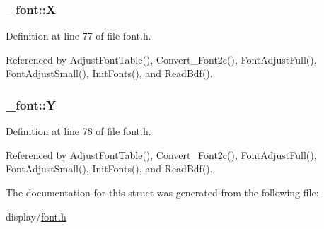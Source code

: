 \hypertarget{struct__font_a64a08fdbdaa19418a9b7a34a2db33150}{
\subsubsection[{X}]{ \-\_\-font\-::\-X}}\label{struct__font_a64a08fdbdaa19418a9b7a34a2db33150}


Definition at line 77 of file font.\-h.



Referenced by Adjust\-Font\-Table(), Convert\-\_\-\-Font2c(), Font\-Adjust\-Full(), Font\-Adjust\-Small(), Init\-Fonts(), and Read\-Bdf().

\hypertarget{struct__font_a3c9fee9cfcc713b1aac812c14dd9a36a}{
\subsubsection[{Y}]{ \-\_\-font\-::\-Y}}\label{struct__font_a3c9fee9cfcc713b1aac812c14dd9a36a}


Definition at line 78 of file font.\-h.



Referenced by Adjust\-Font\-Table(), Convert\-\_\-\-Font2c(), Font\-Adjust\-Full(), Font\-Adjust\-Small(), Init\-Fonts(), and Read\-Bdf().



The documentation for this struct was generated from the following file\-:\begin{DoxyCompactItemize}
\item 
display/\hyperlink{display_2font_8h}{font.\-h}\end{DoxyCompactItemize}
